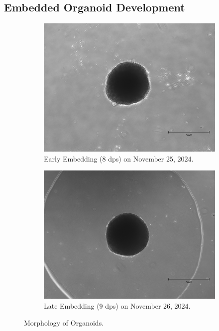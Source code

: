 \documentclass[11pt]{article}
\begin{document}
\subsection{Embedded Organoid Development}

\begin{figure}[H]
    \centering
    \begin{subfigure}[b]{0.40\textwidth}
        \centering
        \includegraphics[width=\textwidth]{Sandra_b1711_ung_emb2511_p1_3.jpeg}
        \caption{Early Embedding (8 dps) on November 25, 2024.}
        \label{fig:Sandra_b1711_ung_emb2511_p1_3}
    \end{subfigure}
    \hfill
    \begin{subfigure}[b]{0.40\textwidth}
        \centering
        \includegraphics[width=\textwidth]{Sandra_b1711_ung_emb2611_p3_2.jpeg}
        \caption{Late Embedding (9 dps) on November 26, 2024.}
        \label{fig:Sandra_b1711_ung_emb2611_p3_2-20}
    \end{subfigure}
    \caption{Morphology of Organoids.}
\end{figure}
\end{document}
